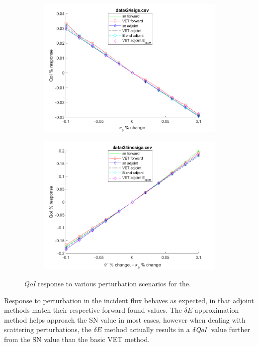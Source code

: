 \documentclass[12pt]{report}
\newcommand{\qoi}{{\it QoI}\xspace}
\begin{document}
\begin{figure}[H]
\begin{subfigure}{.5\textwidth}
  \includegraphics[width=.98\linewidth]{figures2/24sigsSens.png}
  \label{T3:sfig3}
\end{subfigure}%
\begin{subfigure}{.5\textwidth}
  \centering
  \includegraphics[width=.98\linewidth]{figures2/24incsigaSens.png}
  \label{T3:sfig4}
\end{subfigure}
\caption{\qoi response to various perturbation scenarios for the.}
\end{figure}

Response to perturbation in the incident flux behaves as expected, in that adjoint methods match their respective forward found values. The $\delta E$ approximation method helps approach the SN value in most cases, however when dealing with scattering perturbations, the $\delta E$ method actually results in a $\delta \qoi$ value further from the SN value than the basic VET method. 
\end{document}
